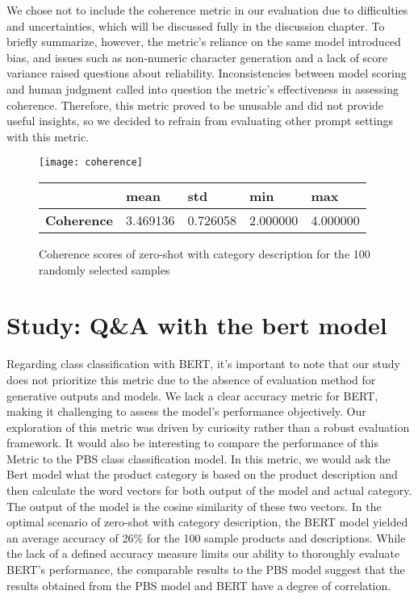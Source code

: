 We chose not to include the coherence metric in our evaluation due to difficulties and uncertainties, which will be discussed fully in the discussion chapter. To briefly summarize, however, the metric's reliance on the same model introduced bias, and issues such as non-numeric character generation and a lack of score variance raised questions about reliability. Inconsistencies between model scoring and human judgment called into question the metric's effectiveness in assessing coherence. Therefore, this metric proved to be unusable and did not provide useful insights, so we decided to refrain from evaluating other prompt settings with this metric. 


\begin{figure}[H]
	\centering
	\texttt{[image: coherence]}
	\begin{tabular}{|l|l|l|l|l|}
		\hline
		\textbf{} & \textbf{mean} & \textbf{std} & \textbf{min} & \textbf{max} \\ \hline
		\textbf{Coherence} & 3.469136  & 0.726058  & 2.000000  & 4.000000 \\ \hline
	\end{tabular}
	\captionsetup{labelformat=andtable}
	\caption{Coherence scores of zero-shot with category description for the 100 randomly selected samples}
	\label{fig:result_coherence}
\end{figure}


\section{Study: Q\&A with the bert model}

Regarding class classification with BERT, it's important to note that our study does not prioritize this metric due to the absence of evaluation method for generative outputs and models. We lack a clear accuracy metric for BERT, making it challenging to assess the model's performance objectively. Our exploration of this metric was driven by curiosity rather than a robust evaluation framework. It would also be interesting to compare the performance of this Metric to the PBS class classification model. In this metric, we would ask the Bert model what the product category is based on the product description and then calculate the word vectors for both output of the model and actual category. The output of the model is the cosine similarity of these two vectors. In the optimal scenario of zero-shot with category description, the BERT model yielded an average accuracy of 26\% for the 100 sample products and descriptions. While the lack of a defined accuracy measure limits our ability to thoroughly evaluate BERT's performance, the comparable results to the PBS model suggest that the results obtained from the PBS model and BERT have a degree of correlation.

